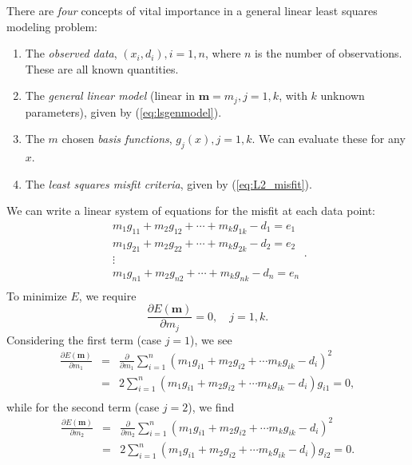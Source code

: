 There are \emph{four} concepts of vital importance in a general linear least squares modeling problem:
\begin{enumerate}
	\item The \emph{observed data}, $(x_i, d_i), i = 1, n$, where $n$ is the number of observations.  These are all known quantities.
	\item The \emph{general linear model} (linear in $\mathbf{m} = m_j, j = 1,k$, with $k$ unknown parameters), given by (\ref{eq:lsgenmodel}).
	\item The $m$ chosen \emph{basis functions}, $g_j(x), j = 1, k$.  We can evaluate these for any $x$.
	\item The \emph{least squares misfit criteria}, given by (\ref{eq:L2_misfit}).
\end{enumerate}
We can write a linear system of equations for the misfit at each data point:
\begin{equation}
\begin{array}{c}
m_1 g_{11} + m_2 g_{12} + \cdots + m_k g_{1k} - d_1 = e_1\\
m_1 g_{21} + m_2 g_{22} + \cdots + m_k g_{2k} - d_2 = e_2\\
\vdots\\
m_1 g_{n1} + m_2 g_{n2} + \cdots + m_k g_{nk} - d_n = e_n\\
\end{array}.
\end{equation}     
To minimize $E$, we require
\begin{equation}
\displaystyle
\frac{\partial E(\mathbf{m})}{\partial m_{j}} = 0, \quad j = 1,k.
\label{eq:L2_criteria}
\end{equation}
Considering the first term (case $j = 1$), we see
\begin{equation}
\begin{array}{rcl}
\displaystyle \frac{\partial E(\mathbf{m})}{\partial m_1} & = & \displaystyle \frac{\partial}{\partial m_1}\sum ^n _{i=1}(m_1g_{i1} + m_2g_{i2} + \cdots m_k g_{ik} -d_i)^2 \\
 & = & \displaystyle 2 \sum ^n _{i=1}(m_1g_{i1} + m_2g_{i2} + \cdots m_k g_{ik} -d_i)g_{i1}= 0, \\
\end{array}
\end{equation}
while for the second term (case $j = 2$), we find
\begin{equation}
\begin{array}{rcl} 
\displaystyle \frac{\partial E(\mathbf{m})}{\partial m_2} & = & \displaystyle \frac{\partial}{\partial m_2}\sum ^n _{i=1}(m_1g_{i1} + m_2g_{i2} + \cdots m_k g_{ik} -d_i)^2 \\
& = & 2 \displaystyle \sum ^n _{i=1}(m_1g_{i1} + m_2g_{i2} + \cdots m_k g_{ik} -d_i)g_{i2}= 0. \\
\end{array}
\end{equation}
